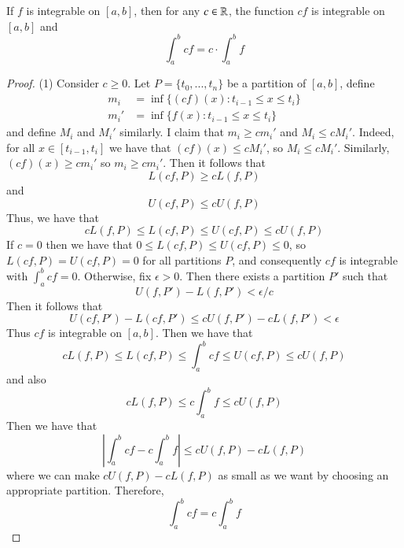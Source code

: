 \documentclass[12pt, a4paper, oneside, openright, titlepage]{book}
\begin{document}
\begin{thm}
    If $f$ is integrable on $[a,b]$, then for any $c \in \mathbb R$, the function $cf$ is integrable on $[a,b]$ and \begin{equation}
        \int_a^bcf = c\cdot\int_a^bf
    \end{equation}
\end{thm}
\begin{proof}
    (1) Consider $c \geq 0$. Let $P = \{t_0,...,t_n\}$ be a partition of $[a,b]$, define \begin{align*}
        m_i &= \inf\{(cf)(x):t_{i-1} \leq x \leq t_i\} \\
        m_i' &= \inf\{f(x):t_{i-1} \leq x \leq t_i\} 
    \end{align*}
    and define $M_i$ and $M_i'$ similarly. I claim that $m_i \geq cm_i'$ and $M_i \leq cM_i'$. Indeed, for all $x \in [t_{i-1},t_i]$ we have that $(cf)(x) \leq cM_i'$, so $M_i \leq cM_i'$. Similarly, $(cf)(x) \geq cm_i'$ so $m_i \geq cm_i'$. Then it follows that $$L(cf,P) \geq cL(f,P)$$ and $$U(cf,P) \leq cU(f,P)$$
    Thus, we have that $$cL(f,P) \leq L(cf,P) \leq U(cf,P) \leq cU(f,P)$$
    If $c = 0$ then we have that $0 \leq L(cf,P) \leq U(cf,P) \leq 0$, so $L(cf,P) = U(cf,P) = 0$ for all partitions $P$, and consequently $cf$ is integrable with $\int_a^bcf = 0$. Otherwise, fix $\epsilon > 0$. Then there exists a partition $P'$ such that $$U(f,P') - L(f,P') < \epsilon/c$$
    Then it follows that \begin{equation*}
        U(cf,P') - L(cf,P') \leq cU(f,P') - cL(f,P') < \epsilon
    \end{equation*}
    Thus $cf$ is integrable on $[a,b]$. Then we have that \begin{equation*}
        cL(f,P) \leq L(cf,P) \leq \int_a^bcf \leq U(cf,P) \leq cU(f,P)
    \end{equation*}
    and also \begin{equation*}
        cL(f,P) \leq c\int_a^bf\leq cU(f,P)
    \end{equation*}
    Then we have that \begin{equation*}
        \left|\int_a^bcf - c\int_a^bf\right| \leq cU(f,P) - cL(f,P) 
    \end{equation*}
    where we can make $cU(f,P) - cL(f,P)$ as small as we want by choosing an appropriate partition. Therefore, \begin{equation*}
        \int_a^bcf = c\int_a^bf
    \end{equation*}



\end{proof}
\end{document}
